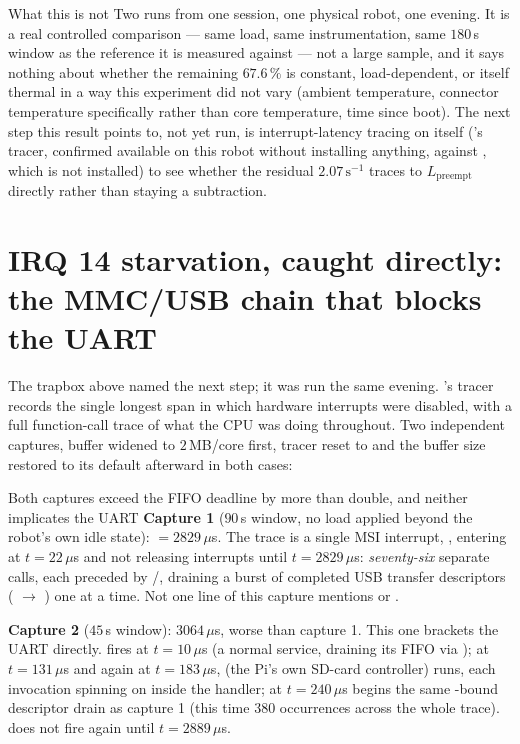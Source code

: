 \begin{trapbox}{What this is not}
Two runs from one session, one physical robot, one evening. It is a real
controlled comparison --- same load, same instrumentation, same
$180$\,s window as the reference it is measured against --- not a large
sample, and it says nothing about whether the remaining $67.6\,\%$ is
constant, load-dependent, or itself thermal in a way this experiment did
not vary (ambient temperature, connector temperature specifically rather
than core temperature, time since boot). The next step this result points
to, not yet run, is interrupt-latency tracing on  itself
('s  tracer, confirmed available on this robot
without installing anything, against , which is not
installed) to see whether the residual $2.07\,\mathrm{s}^{-1}$ traces to
$L_{\mathrm{preempt}}$ directly rather than staying a subtraction.
\end{trapbox}

\section{IRQ 14 starvation, caught directly: the MMC/USB chain that blocks
the UART}
\label{sec:aug13irqsoff}

The trapbox above named the next step; it was run the same evening.
's  tracer records the single longest span in
which hardware interrupts were disabled, with a full function-call trace of
what the CPU was doing throughout. Two independent captures, buffer
widened to $2$\,MB/core first, tracer reset to  and the buffer
size restored to its default afterward in both cases:

\begin{casestudy}{Both captures exceed the FIFO deadline by more than
double, and neither implicates the UART}
\textbf{Capture 1} ($90$\,s window, no load applied beyond the robot's own
idle state):  $=2829\,\mu$s. The trace is a
single MSI interrupt, , entering at $t{=}22\,\mu$s and not
releasing interrupts until $t{=}2829\,\mu$s: \emph{seventy-six} separate
 calls, each preceded by
/,
draining a burst of completed USB transfer descriptors
( $\to$ ) one at a time. Not one
line of this capture mentions  or .

\textbf{Capture 2} ($45$\,s window): $3064\,\mu$s, worse than capture 1.
This one brackets the UART directly.  fires at
$t{=}10\,\mu$s (a normal service, draining its FIFO via
); at $t{=}131\,\mu$s and again at
$t{=}183\,\mu$s,  (the Pi's own SD-card
controller) runs, each invocation spinning on  inside the
handler; at $t{=}240\,\mu$s  begins the same
-bound descriptor drain as capture 1 (this time $380$
 occurrences across the whole trace).  does
not fire again until $t{=}2889\,\mu$s.
\end{casestudy}

